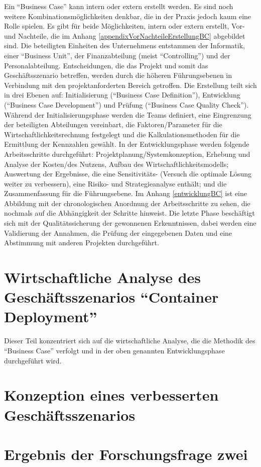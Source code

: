 Ein \enquote{Business Case} kann intern oder extern erstellt werden. Es sind noch weitere Kombinationsmöglichkeiten denkbar, die in der Praxis jedoch kaum eine Rolle spielen.\autocite[vgl.][S.33]{brugger_it_2009} Es gibt für beide Möglichkeiten, intern oder extern erstellt, Vor- und Nachteile, die im Anhang \vref{appendixVorNachteileErstellungBC} abgebildet sind. Die beteiligten Einheiten des Unternehmens entstammen der Informatik, einer \enquote{Business Unit}, der Finanzabteilung (meist \enquote{Controlling}) und der Personalabteilung. Entscheidungen, die das Projekt und somit das Geschäftsszenario betreffen, werden durch die höheren Führungsebenen in Verbindung mit den projektanforderten Bereich getroffen. Die Erstellung teilt sich in drei Ebenen auf: Initialisierung (\enquote{Business Case Definition}), Entwicklung (\enquote{Business Case Development}) und Prüfung (\enquote{Business Case Quality Check}).\autocite[vgl.][S.41-42]{brugger_it_2009} Während der Initialisierungsphase werden die Teams definiert, eine Eingrenzung der beteiligten Abteilungen vereinbart, die Faktoren/Parameter für die Wirtschaftlichkeitsrechnung festgelegt und die Kalkulationsmethoden für die Ermittlung der Kennzahlen gewählt. In der Entwicklungsphase werden folgende Arbeitsschritte durchgeführt: Projektplanung/Systemkonzeption, Erhebung und Analyse der Kosten/des Nutzens, Aufbau des Wirtschaftlichkeitsmodells; Auswertung der Ergebnisse, die eine Sensitivitäts- (Versuch die optimale Lösung weiter zu verbessern), eine Risiko- und Strategieanalyse enthält; und die Zusammenfassung für die Führungsebene. Im Anhang \vref{entwicklungBC} ist eine Abbildung mit der chronologischen Anordnung der Arbeitsschritte zu sehen, die nochmals auf die Abhängigkeit der Schritte hinweist. Die letzte Phase beschäftigt sich mit der Qualitätssicherung der gewonnenen Erkenntnissen, dabei werden eine Validierung der Annahmen, die Prüfung der eingegebenen Daten und eine Abstimmung mit anderen Projekten durchgeführt. 

\section{Wirtschaftliche Analyse des Geschäftsszenarios \enquote{Container Deployment}}
Dieser Teil konzentriert sich auf die wirtschaftliche Analyse, die die Methodik des \enquote{Business Case} verfolgt und in der oben genannten Entwicklungsphase durchgeführt wird. 
\section{Konzeption eines verbesserten Geschäftsszenarios}

\section{Ergebnis der Forschungsfrage zwei}
